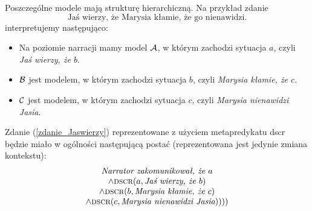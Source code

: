 \documentclass[a4paper,12pt]{article}
\newcommand{\type}[2]{\text{{\sc type}}(#1,\text{#2})}
\newcommand{\dscr}[2]{\text{{\sc dscr}}(#1,#2)}
\begin{document}
Poszczególne modele mają strukturę hierarchiczną. 
Na przykład zdanie 
\begin{equation}\label{zdanie_Jaswierzy}
\text{Jaś wierzy, że Marysia kłamie, że go nienawidzi.}
\end{equation}
interpretujemy następująco:
\begin{itemize}
\item Na poziomie narracji mamy model ${\cal A}$, w którym zachodzi sytuacja $a$, czyli {\it Jaś wierzy, że ${b}$}.
\item ${\cal B}$ jest modelem, w którym zachodzi sytuacja $b$, czyli {\it Marysia kłamie, że $c$}.
\item ${\cal C}$ jest modelem, w którym zachodzi sytuacja $c$, czyli {\it Marysia nienawidzi Jasia}.
\end{itemize}
{
Zdanie (\ref{zdanie_Jaswierzy}) reprezentowane z użyciem metapredykatu {\sc dscr} będzie miało w ogólności następującą postać 
(reprezentowana jest jedynie zmiana kontekstu):}
\begin{equation}
\begin{array}{c}
\text{{\it Narrator zakomunikował, że }} a \\
\wedge 
\dscr{a}{\text{{\it Jaś wierzy, że }} b} \\
\wedge 
\dscr{b}{\text{{\it Marysia kłamie, że }} c} \\
\wedge 
\dscr{c}{\text{{\it Marysia nienawidzi Jasia}}})))
\end{array}
\end{equation}
\end{document}
